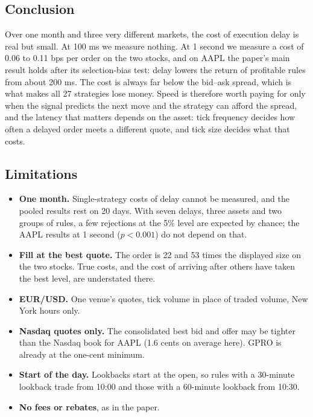 \documentclass[11pt]{article}
\begin{document}
\subsection{Conclusion}

Over one month and three very different markets, the cost of execution delay is
real but small. At 100 ms we measure nothing. At 1 second we measure a cost of
0.06 to 0.11 bps per order on the two stocks, and on AAPL the paper's main result
holds after its selection-bias test: delay lowers the return of profitable rules
from about 200 ms. The cost is always far below the bid--ask spread, which is what
makes all 27 strategies lose money. Speed is therefore worth paying for only when
the signal predicts the next move and the strategy can afford the spread, and the
latency that matters depends on the asset: tick frequency decides how often a
delayed order meets a different quote, and tick size decides what that costs.

\subsection{Limitations}

\begin{itemize}
  \item \textbf{One month.} Single-strategy costs of delay cannot be measured, and
        the pooled results rest on 20 days. With seven delays, three assets and two
        groups of rules, a few rejections at the 5\% level are expected by chance;
        the AAPL results at 1 second ($p < 0.001$) do not depend on that.
  \item \textbf{Fill at the best quote.} The order is 22 and 53 times the displayed
        size on the two stocks. True costs, and the cost of arriving after others
        have taken the best level, are understated there.
  \item \textbf{EUR/USD.} One venue's quotes, tick volume in place of traded
        volume, New York hours only.
  \item \textbf{Nasdaq quotes only.} The consolidated best bid and offer may be
        tighter than the Nasdaq book for AAPL (1.6 cents on average here). GPRO is
        already at the one-cent minimum.
  \item \textbf{Start of the day.} Lookbacks start at the open, so rules with a
        30-minute lookback trade from 10:00 and those with a 60-minute lookback
        from 10:30.
  \item \textbf{No fees or rebates}, as in the paper.
\end{itemize}
\end{document}
